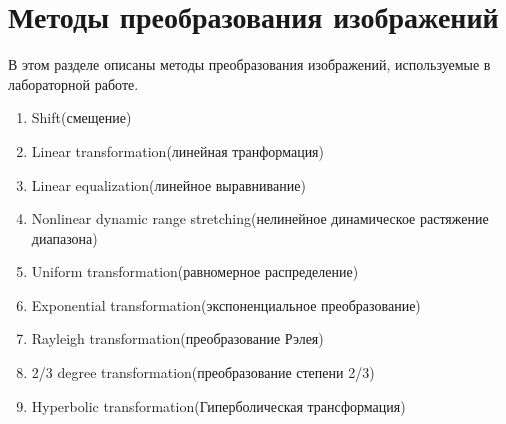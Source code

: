 \documentclass[a4paper,12pt]{article}
\begin{document}
\section{Методы преобразования изображений}
В этом разделе описаны методы преобразования изображений, используемые в лабораторной работе.
\begin{enumerate}
    \item  Shift(смещение)
    \item  Linear transformation(линейная транформация)
    \item  Linear equalization(линейное выравнивание)
    \item  Nonlinear dynamic range stretching(нелинейное динамическое растяжение диапазона)
    \item Uniform transformation(равномерное распределение)
    \item  Exponential transformation(экспоненциальное преобразование)
    \item  Rayleigh transformation(преобразование Рэлея)
     \item 2/3 degree transformation(преобразование степени 2/3)
     \item Hyperbolic transformation(Гиперболическая трансформация)
\end{enumerate}
\end{document}

